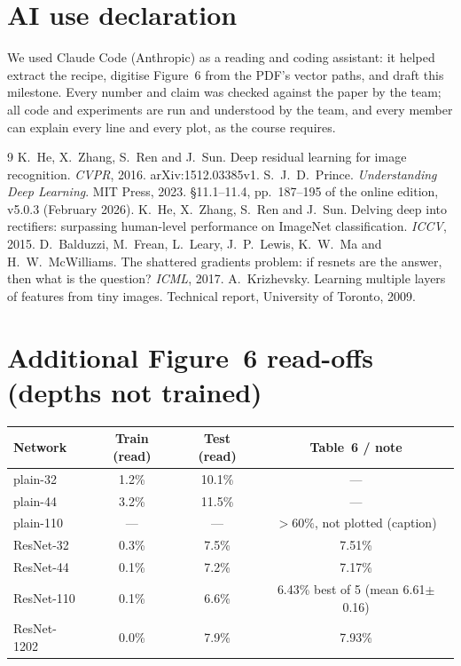 \documentclass[11pt,a4paper]{article}
\begin{document}
\section*{AI use declaration}
We used Claude Code (Anthropic) as a reading and coding assistant: it helped extract the recipe, digitise Figure~6 from the PDF's vector paths, and draft this milestone. Every number and claim was checked against the paper by the team; all code and experiments are run and understood by the team, and every member can explain every line and every plot, as the course requires.

\begin{thebibliography}{9}
 K.~He, X.~Zhang, S.~Ren and J.~Sun. Deep residual learning for image recognition. \emph{CVPR}, 2016. arXiv:1512.03385v1.
 S.~J.~D.~Prince. \emph{Understanding Deep Learning}. MIT Press, 2023. \S11.1--11.4, pp.~187--195 of the online edition, v5.0.3 (February 2026).
 K.~He, X.~Zhang, S.~Ren and J.~Sun. Delving deep into rectifiers: surpassing human-level performance on ImageNet classification. \emph{ICCV}, 2015.
 D.~Balduzzi, M.~Frean, L.~Leary, J.~P.~Lewis, K.~W.~Ma and H.~W.~McWilliams. The shattered gradients problem: if resnets are the answer, then what is the question? \emph{ICML}, 2017.
 A.~Krizhevsky. Learning multiple layers of features from tiny images. Technical report, University of Toronto, 2009.
\end{thebibliography}

\appendix
\section{Additional Figure~6 read-offs (depths not trained)}
\begin{table}[htbp]
\centering
\small
\begin{tabular}{@{}lccc@{}}
\toprule
\textbf{Network} & \textbf{Train (read)} & \textbf{Test (read)} & \textbf{Table~6 / note}\\
\midrule
plain-32  & 1.2\% & 10.1\% & ---\\
plain-44  & 3.2\% & 11.5\% & ---\\
plain-110 & --- & --- & $>60\%$, not plotted (caption)\\
ResNet-32 & 0.3\% & 7.5\%  & 7.51\%\\
ResNet-44 & 0.1\% & 7.2\%  & 7.17\%\\
ResNet-110 & 0.1\% & 6.6\% & 6.43\% best of 5 (mean 6.61$\pm$0.16)\\
ResNet-1202 & 0.0\% & 7.9\% & 7.93\%\\
\bottomrule
\end{tabular}
\end{table}
\end{document}
